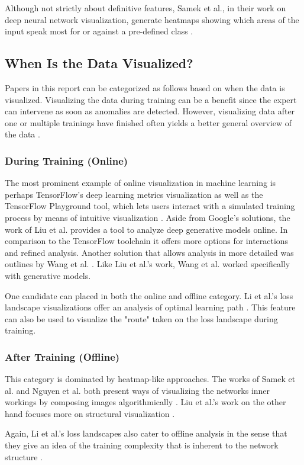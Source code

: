 \documentclass{acmsiggraph}               %
\begin{document}
Although not strictly about definitive features, Samek et al., in their work on deep neural network visualization, generate heatmaps showing which areas of the input speak most for or against a pre-defined class \cite{Samek2017}.

\subsection{When Is the Data Visualized?}
Papers in this report can be categorized as follows based on when the data is visualized. Visualizing the data during training can be a benefit since the expert can intervene as soon as anomalies are detected. However, visualizing data after one or multiple trainings have finished often yields a better general overview of the data \cite{Hohman2018}.
\subsubsection{During Training (Online)}
The most prominent example of online visualization in machine learning is perhaps TensorFlow's deep learning metrics visualization \cite{Wongsuphasawat2018} as well as the TensorFlow Playground tool, which lets users interact with a simulated training process by means of intuitive visualization \cite{Smilkov2017}.
Aside from Google's solutions, the work of Liu et al. \cite{Liu2018} provides a tool to analyze deep generative models online. In comparison to the TensorFlow toolchain it offers more options for interactions and refined analysis. Another solution that allows analysis in more detailed was outlines by Wang et al. \cite{Wang}. Like Liu et al.'s work, Wang et al. worked specifically with generative models.

One candidate can placed in both the online and offline category. Li et al.'s loss landscape visualizations offer an analysis of optimal learning path \cite{Li2017}. This feature can also be used to visualize the "route" taken on the loss landscape during training.

\subsubsection{After Training (Offline)}
This category is dominated by heatmap-like approaches. The works of Samek et al. and Nguyen et al. both present ways of visualizing the networks inner workings by composing images algorithmically \cite{Samek2017,Nguyen2016}. 
Liu et al.'s work on the other hand focuses more on structural visualization \cite{Liu2016}.

Again, Li et al.'s loss landscapes also cater to offline analysis in the sense that they give an idea of the training complexity that is inherent to the network structure \cite{Li2017}.


\nocite{*}

\end{document}

